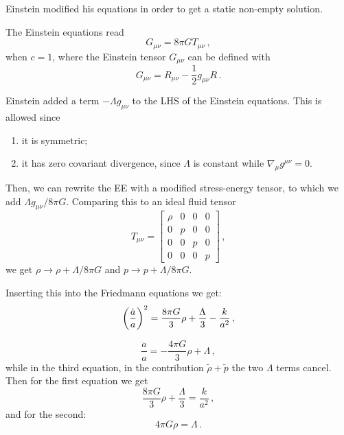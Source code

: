 \documentclass[main.tex]{subfiles}
\begin{document}
Einstein modified his equations in order to get a static non-empty solution.

The Einstein equations read 
%
\begin{equation}
  G_{\mu \nu } = 8 \pi G T_{\mu \nu }
\,,
\end{equation}
%
when \(c=1\), where the Einstein tensor \(G_{\mu \nu }\) can be defined with 
%
\begin{equation}
  G_{ \mu \nu } = R_{\mu \nu } - \frac{1}{2} g_{\mu \nu }R
\,.
\end{equation}

Einstein added a term \(- \Lambda g_{\mu \nu }\) to the LHS of the Einstein equations. This is allowed since 

\begin{enumerate}
    \item it is symmetric;
    \item it has zero covariant divergence, since \(\Lambda \) is constant while \(\nabla_{\mu } g^{\mu \nu } = 0\).
\end{enumerate}

Then, we can rewrite the EE with a modified stress-energy tensor, to which we add \(\Lambda g_{\mu \nu } / 8 \pi G\). Comparing this to an ideal fluid tensor 
%
\begin{equation}
  T_{\mu \nu } = \left[\begin{array}{cccc}
  \rho & 0 & 0 & 0 \\ 
  0 & p & 0 & 0 \\ 
  0 & 0 & p & 0 \\ 
  0 & 0 & 0 & p
  \end{array}\right]
\,,
\end{equation}
%
we get \(\rho \rightarrow \rho + \Lambda/ 8 \pi G \) and \(p \rightarrow p + \Lambda  / 8 \pi G\).

Inserting this into the Friedmann equations we get: 
%
\begin{equation}
  \qty(\frac{\dot{a} }{a})^2= 
  \frac{8 \pi G}{3} \rho + \frac{\Lambda }{3}
  - \frac{k}{a^2}
\,,
\end{equation}
%

%
\begin{equation}
  \frac{\ddot{a}}{a} = - \frac{4 \pi G}{3} \rho + \Lambda 
\,,
\end{equation}
%
while in the third equation, in the contribution \(\widetilde{\rho }  + \widetilde{p} \) the two \(\Lambda \) terms cancel. Then for the first equation we get 
%
\begin{equation}
  \frac{8 \pi G}{3} \rho + \frac{\Lambda}{3} = \frac{k}{a^2}
\,,
\end{equation}
%
and for the second: 
%
\begin{equation}
  4 \pi G \rho = \Lambda 
\,.
\end{equation}
\end{document}
